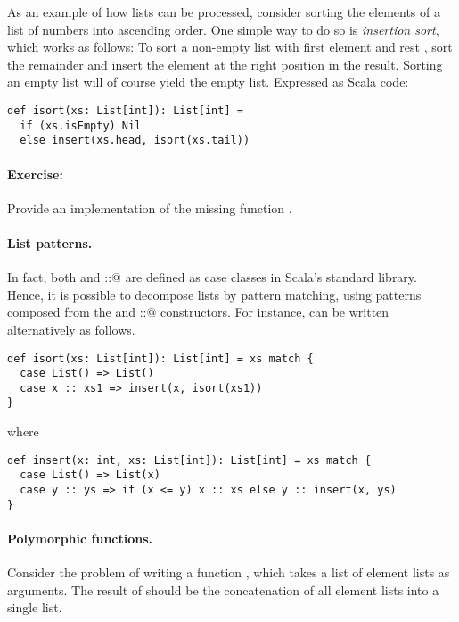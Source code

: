 \documentclass[11pt]{book}
\newcommand{\exercise}{\paragraph{Exercise:}}
\begin{document}
As an example of how lists can be processed, consider sorting the
elements of a list of numbers into ascending order. One simple way to
do so is {\em insertion sort}, which works as follows: To sort a
non-empty list with first element \verb@x@ and rest \verb@xs@, sort
the remainder \verb@xs@ and insert the element \verb@x@ at the right
position in the result. Sorting an empty list will of course yield the
empty list. Expressed as Scala code:
\begin{verbatim}
def isort(xs: List[int]): List[int] =
  if (xs.isEmpty) Nil
  else insert(xs.head, isort(xs.tail))
\end{verbatim}

\exercise Provide an implementation of the missing function
\verb@insert@.

\paragraph{List patterns.} In fact, both \verb@Nil@ and \verb@::@ are
defined as case classes in Scala's standard library. Hence, it is
possible to decompose lists by pattern matching, using patterns
composed from the \verb@Nil@ and \verb@::@ constructors. For instance, \verb@isort@ can
be written alternatively as follows.
\begin{verbatim}
def isort(xs: List[int]): List[int] = xs match {
  case List() => List()
  case x :: xs1 => insert(x, isort(xs1))
}
\end{verbatim}
where
\begin{verbatim}
def insert(x: int, xs: List[int]): List[int] = xs match {
  case List() => List(x)
  case y :: ys => if (x <= y) x :: xs else y :: insert(x, ys)
}
\end{verbatim}

\paragraph{Polymorphic functions.} Consider the problem of writing a
  function \verb@concat@, which takes a list of element lists as
  arguments. The result of \verb@concat@ should be the concatenation of all
  element lists into a single list. 
\end{document}
